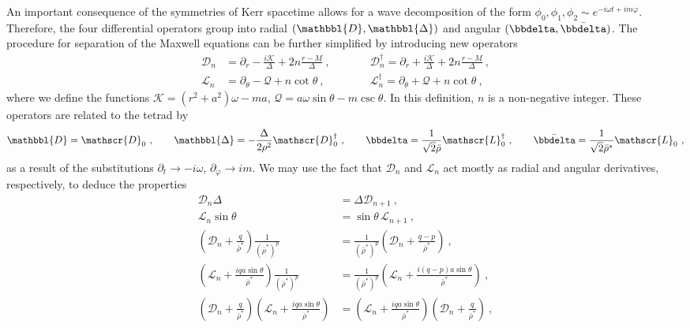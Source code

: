 An important consequence of the symmetries of Kerr spacetime allows for a wave decomposition of the form $\phi_0, \phi_1, \phi_2 \sim e^{- i \omega t + i m \varphi}$.
Therefore, the four differential operators group into radial $(\mathbbl{D}, \mathbbl{\Delta})$ and angular $(\bbdelta, \bar{\bbdelta})$. The procedure for separation of the Maxwell equations can be further simplified by introducing new operators
\begin{equation}
    \begin{alignedat}{3}
        \mathscr{D}_n &= \partial_r - \frac{i \mathscr{K}}{\Delta} + 2n \frac{r-M}{\Delta} ~,\qquad && \mathscr{D}_n^\dagger = \partial_r + \frac{i \mathscr{K}}{\Delta} + 2n \frac{r-M}{\Delta} ~,\\
        \mathscr{L}_n &= \partial_\theta - \mathscr{Q} + n \cot\theta ~,\qquad && \mathscr{L}_n^\dagger = \partial_\theta + \mathscr{Q} + n \cot\theta ~,
    \end{alignedat}
\end{equation}
where we define the functions $\mathscr{K}=(r^2+a^2)\omega - m a$, $\mathscr{Q} = a \omega \sin\theta - m \csc\theta$.
In this definition, $n$ is a non-negative integer.
These operators are related to the tetrad by
\begin{align}
    \mathbbl{D} = \mathscr{D}_0 ~,\qquad \mathbbl{\Delta} = - \frac{\Delta}{2 \rho^2 }\mathscr{D}^\dagger_0 ~,\qquad \bbdelta = \frac{1}{\sqrt{2} \bar{\rho}} \mathscr{L}^\dagger_0 ~,\qquad \bar\bbdelta = \frac{1}{\sqrt{2} \bar{\rho}^*} \mathscr{L}_0 ~,
\end{align}
as a result of the substitutions $\partial_t\rightarrow-i \omega$, $\partial_\varphi\rightarrow i m$.
We may use the fact that $\mathscr{D}_n$ and $\mathscr{L}_n$ act mostly as radial and angular derivatives, respectively, to deduce the properties
\begin{subequations}
    \begin{align}
        \label{eq3:propDeltaD}
        \mathscr{D}_n \Delta &= \Delta \mathscr{D}_{n+1} ~, \\[0.15cm]
        \label{eq3:propSinL}
        \mathscr{L}_n \sin\theta &= \sin\theta\, \mathscr{L}_{n+1} ~, \\[0.15cm]
        \label{eq3:propBarRhoD}
        \left(\mathscr{D}_n + \frac{q}{\bar{\rho}^*} \right) \frac{1}{(\bar{\rho}^*)^p} &= 
        \frac{1}{(\bar{\rho}^*)^p} \left(\mathscr{D}_n + \frac{q-p}{\bar{\rho}^*} \right) ~, \\[0.15cm]
        \label{eq3:propBarRhoL}
        \left(\mathscr{L}_n + \frac{i q a \sin\theta}{\bar{\rho}^*} \right) \frac{1}{(\bar{\rho}^*)^p} &= 
        \frac{1}{(\bar{\rho}^*)^p} \left(\mathscr{L}_n + \frac{i (q-p) a \sin\theta}{\bar{\rho}^*} \right) ~, \\[0.15cm]
        \label{eq3:propCommutLD}
        \left(\mathscr{D}_n + \frac{q}{\bar{\rho}^*} \right) 
        \left(\mathscr{L}_n + \frac{i q a \sin\theta}{\bar{\rho}^*} \right) &= 
        \left(\mathscr{L}_n + \frac{i q a \sin\theta}{\bar{\rho}^*} \right)
        \left(\mathscr{D}_n + \frac{q}{\bar{\rho}^*} \right) ~,
    \end{align}
\end{subequations}
